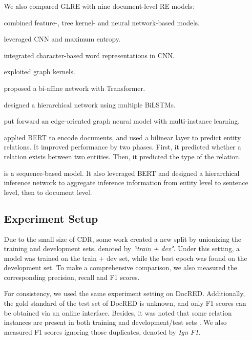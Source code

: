 \documentclass[11pt,a4paper]{article}
\begin{document}
We also compared GLRE with nine document-level RE models: 
\begin{compactitem}
\item \citet{zhou2016exploiting} combined feature-, tree kernel- and neural network-based models.
\item \citet{gu2017chemical} leveraged CNN and maximum entropy.
\item \citet{nguyen2018convolutional} integrated character-based word representations in CNN.
\item \citet{panyam2018exploiting} exploited graph kernels.
\item \citet{verga2018simultaneously} proposed a bi-affine network with Transformer.
\item \citet{zheng2018effective} designed a hierarchical network using multiple BiLSTMs.
\item \citet{christopoulou2019connecting} put forward an edge-oriented graph neural model with multi-instance learning.
\item \citet{wang2019fine} applied BERT to encode documents, and used a bilinear layer to predict entity relations. It improved performance by two phases. First, it predicted whether a relation exists between two entities. Then, it predicted the type of the relation.
\item \citet{tang2020hin} is a sequence-based model. It also leveraged BERT and designed a hierarchical inference network to aggregate inference information from entity level to sentence level, then to document level.
\end{compactitem}

\subsection{Experiment Setup}

Due to the small size of CDR, some work \cite{zhou2016exploiting,verga2018simultaneously,zheng2018effective,christopoulou2019connecting} created a new split by unionizing the training and development sets, denoted by \emph{``train + dev"}. Under this setting, a model was trained on the train + dev set, while the best epoch was found on the development set. To make a comprehensive comparison, we also measured the corresponding precision, recall and F1 scores.

For consistency, we used the same experiment setting on DocRED. Additionally, the gold standard of the test set of DocRED is unknown, and only F1 scores can be obtained via an online interface. Besides, it was noted that some relation instances are present in both training and development/test sets \cite{yao2019docred}. We also measured F1 scores ignoring those duplicates, denoted by \emph{Ign F1}.
\end{document}
